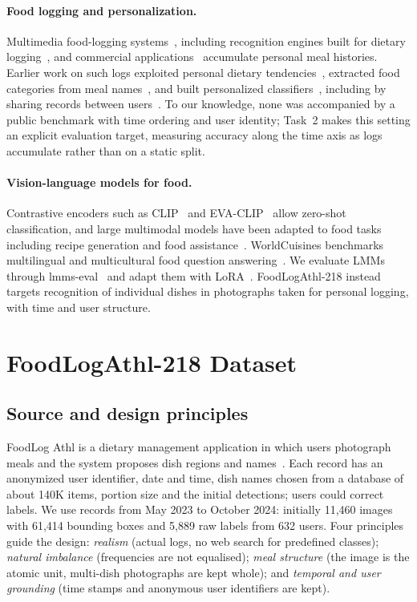 \documentclass[sigconf, nonacm]{acmart}
\begin{document}
\paragraph{Food logging and personalization.}
Multimedia food-logging systems~\cite{aizawa2015foodlog,nakamoto2022foodlog}, including recognition engines built for dietary logging~\cite{merler2016snap}, and commercial applications~\cite{asken,myfitnesspal} accumulate personal meal histories. Earlier work on such logs exploited personal dietary tendencies~\cite{Aizawa2013FoodBalance}, extracted food categories from meal names~\cite{Amano2015FoodCategory}, and built personalized classifiers~\cite{flg469,Horiguchi2018Personalized}, including by sharing records between users~\cite{Kim2021Boosting}. To our knowledge, none was accompanied by a public benchmark with time ordering and user identity; Task~2 makes this setting an explicit evaluation target, measuring accuracy along the time axis as logs accumulate rather than on a static split.

\paragraph{Vision-language models for food.}
Contrastive encoders such as CLIP~\cite{CLIP} and EVA-CLIP~\cite{sun2023eva} allow zero-shot classification, and large multimodal models have been adapted to food tasks including recipe generation and food assistance~\cite{yin2023foodlmm,jiao2024rode,Imajuku2025FoodMLLM}. WorldCuisines benchmarks multilingual and multicultural food question answering~\cite{winata2024worldcuisines}. We evaluate LMMs through lmms-eval~\cite{lmms_eval2024,zhang2024lmmsevalrealitycheckevaluation} and adapt them with LoRA~\cite{hu2022lora}. FoodLogAthl-218 instead targets recognition of individual dishes in photographs taken for personal logging, with time and user structure.

\section{FoodLogAthl-218 Dataset}
\subsection{Source and design principles}
FoodLog Athl is a dietary management application in which users photograph meals and the system proposes dish regions and names~\cite{nakamoto2022foodlog}. Each record has an anonymized user identifier, date and time, dish names chosen from a database of about 140K items, portion size and the initial detections; users could correct labels. We use records from May 2023 to October 2024: initially 11,460 images with 61,414 bounding boxes and 5,889 raw labels from 632 users. Four principles guide the design: \emph{realism} (actual logs, no web search for predefined classes); \emph{natural imbalance} (frequencies are not equalised); \emph{meal structure} (the image is the atomic unit, multi-dish photographs are kept whole); and \emph{temporal and user grounding} (time stamps and anonymous user identifiers are kept).
\end{document}
